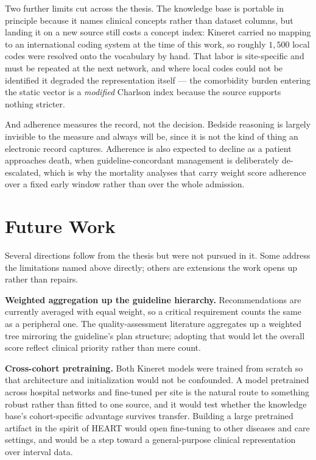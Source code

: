 Two further limits cut across the thesis. The knowledge base is portable in
principle because it names clinical concepts rather than dataset columns, but
landing it on a new source still costs a concept index: Kineret carried no
mapping to an international coding system at the time of this work, so roughly
$1{,}500$ local codes were resolved onto the vocabulary by hand. That labor is
site-specific and must be repeated at the next network, and where local codes
could not be identified it degraded the representation itself --- the
comorbidity burden entering the static vector is a \emph{modified} Charlson
index because the source supports nothing stricter.

And adherence measures the record, not the decision. Bedside reasoning is
largely invisible to the measure and always will be, since it is not the kind of
thing an electronic record captures. Adherence is also expected to decline as a
patient approaches death, when guideline-concordant management is deliberately
de-escalated, which is why the mortality analyses that carry weight score
adherence over a fixed early window rather than over the whole admission.

\section{Future Work}
\label{sec:future-work}

Several directions follow from the thesis but were not pursued in it. Some
address the limitations named above directly; others are extensions the work
opens up rather than repairs.

\textbf{Weighted aggregation up the guideline hierarchy.} Recommendations are
currently averaged with equal weight, so a critical requirement counts the
same as a peripheral one. The quality-assessment literature aggregates up a
weighted tree mirroring the guideline's plan structure; adopting that would
let the overall score reflect clinical priority rather than mere count.

\textbf{Cross-cohort pretraining.} Both Kineret models were trained from
scratch so that architecture and initialization would not be confounded. A
model pretrained across hospital networks and fine-tuned per site is the
natural route to something robust rather than fitted to one source, and it
would test whether the knowledge base's cohort-specific advantage survives
transfer. Building a large pretrained artifact in the spirit of HEART
\citep{huang2024heart} would open fine-tuning to other diseases and care
settings, and would be a step toward a general-purpose clinical
representation over interval data.

